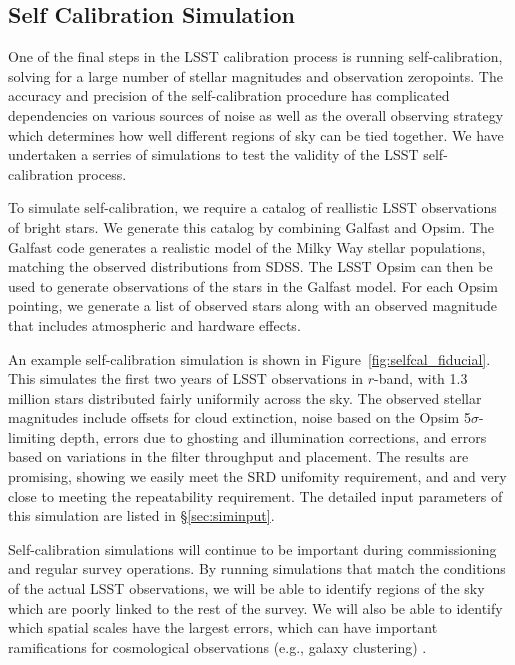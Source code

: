 \documentclass[12pt,preprint]{aastex}
\begin{document}
\subsection{Self Calibration Simulation}\label{sec:selfcalsim}

One of the final steps in the LSST calibration process is running self-calibration, solving for a large number of stellar magnitudes and observation zeropoints.  The accuracy and precision of the self-calibration procedure has complicated dependencies on various sources of noise as well as the overall observing strategy which determines how well different regions of sky can be tied together.  We have undertaken a serries of simulations to test the validity of the LSST self-calibration process.

To simulate self-calibration, we require a catalog of reallistic LSST observations of bright stars.  We generate this catalog by combining Galfast and Opsim.  The Galfast code generates a realistic model of the Milky Way stellar populations, matching the observed distributions from SDSS.  The LSST Opsim can then be used to generate observations of the stars in the Galfast model.  For each Opsim pointing, we generate a list of observed stars along with an observed magnitude that includes atmospheric and hardware effects.  

An example self-calibration simulation is shown in Figure~\ref{fig:selfcal_fiducial}.  This simulates the first two years of LSST observations in $r$-band, with 1.3 million stars distributed fairly uniformily across the sky.  The observed stellar magnitudes include offsets for cloud extinction, noise based on the Opsim 5$\sigma$-limiting depth, errors due to ghosting and illumination corrections, and errors based on variations in the filter throughput and placement.  The results are promising, showing we easily meet the SRD unifomity requirement, and and very close to meeting the repeatability requirement.  The detailed input parameters of this simulation are listed in \S\ref{sec:siminput}.

Self-calibration simulations will continue to be important during commissioning and regular survey operations.  By running simulations that match the conditions of the actual LSST observations, we will be able to identify regions of the sky which are poorly linked to the rest of the survey.  We will also be able to identify which spatial scales have the largest errors, which can have important ramifications for cosmological observations (e.g., galaxy clustering) \citep{Huterer13}. 
\end{document}
